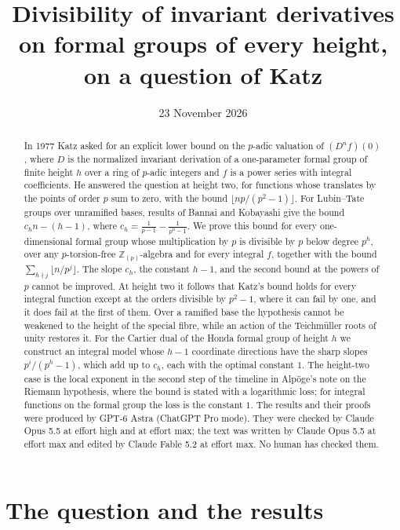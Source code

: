 \documentclass[11pt]{amsart}
\title[Invariant derivatives at every height]{Divisibility of invariant derivatives on formal groups of every height, on a question of Katz}
\author{}
\date{23 November 2026}
\theoremstyle{definition}
\theoremstyle{remark}
\newcommand{\Z}{\mathbb Z}
\begin{document}
\begin{abstract}
In 1977 Katz asked for an explicit lower bound on the $p$-adic valuation of $(D^nf)(0)$, where $D$ is the normalized invariant derivation of a one-parameter formal group of finite height $h$ over a ring of $p$-adic integers and $f$ is a power series with integral coefficients. He answered the question at height two, for functions whose translates by the points of order $p$ sum to zero, with the bound $\lfloor np/(p^2-1)\rfloor$. For Lubin--Tate groups over unramified bases, results of Bannai and Kobayashi give the bound $c_hn-(h-1)$, where $c_h=\frac1{p-1}-\frac1{p^h-1}$. We prove this bound for every one-dimensional formal group whose multiplication by $p$ is divisible by $p$ below degree $p^h$, over any $p$-torsion-free $\Z_{(p)}$-algebra and for every integral $f$, together with the bound $\sum_{h\nmid j}\lfloor n/p^j\rfloor$. The slope $c_h$, the constant $h-1$, and the second bound at the powers of $p$ cannot be improved. At height two it follows that Katz's bound holds for every integral function except at the orders divisible by $p^2-1$, where it can fail by one, and it does fail at the first of them. Over a ramified base the hypothesis cannot be weakened to the height of the special fibre, while an action of the Teichm\"uller roots of unity restores it. For the Cartier dual of the Honda formal group of height $h$ we construct an integral model whose $h-1$ coordinate directions have the sharp slopes $p^i/(p^h-1)$, which add up to $c_h$, each with the optimal constant $1$. The height-two case is the local exponent in the second step of the timeline in Alp\"oge's note on the Riemann hypothesis, where the bound is stated with a logarithmic loss; for integral functions on the formal group the loss is the constant $1$. The results and their proofs were produced by GPT-6 Astra (ChatGPT Pro mode). They were checked by Claude Opus 5.5 at effort high and at effort max; the text was written by Claude Opus 5.5 at effort max and edited by Claude Fable 5.2 at effort max. No human has checked them.
\end{abstract}

\maketitle

\section{The question and the results}
\end{document}
